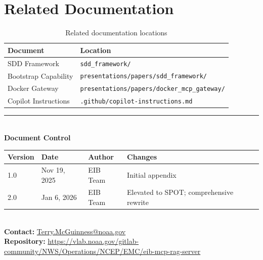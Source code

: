 \documentclass[11pt,letterpaper,twoside]{article}
\newcommand{\filepath}[1]{\texttt{\footnotesize #1}}
\begin{document}
\section{Related Documentation}

\begin{table}[H]
\centering
\renewcommand{\arraystretch}{1.3}
\begin{tabular}{l|l}
\toprule
\textbf{Document} & \textbf{Location} \\
\midrule
SDD Framework & \filepath{sdd\_framework/} \\
Bootstrap Capability & \filepath{presentations/papers/sdd\_framework/} \\
Docker Gateway & \filepath{presentations/papers/docker\_mcp\_gateway/} \\
Copilot Instructions & \filepath{.github/copilot-instructions.md} \\
\bottomrule
\end{tabular}
\caption{Related documentation locations}
\end{table}

\vfill
\begin{center}
\rule{0.8\linewidth}{0.5pt}\\[1em]
\textbf{Document Control}\\[0.5em]
\begin{tabular}{l|l|l|l}
\textbf{Version} & \textbf{Date} & \textbf{Author} & \textbf{Changes} \\
\hline
1.0 & Nov 19, 2025 & EIB Team & Initial appendix \\
2.0 & Jan 6, 2026 & EIB Team & Elevated to SPOT; comprehensive rewrite \\
\end{tabular}\\[1em]
\textbf{Contact:} \href{mailto:Terry.McGuinness@noaa.gov}{Terry.McGuinness@noaa.gov}\\[0.5em]
\textbf{Repository:} {\small\url{https://vlab.noaa.gov/gitlab-community/NWS/Operations/NCEP/EMC/eib-mcp-rag-server}}
\end{center}
\end{document}
